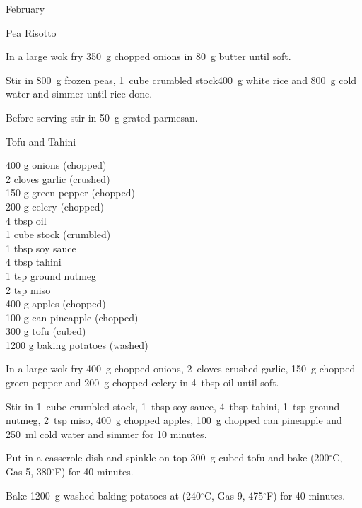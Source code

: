 \begin{menu}{February}
\begin{recipe}{2}{Pea Risotto}
	
    \begin{instructions}
    \item 
        In a large wok fry
        350~g chopped onions
        in
        80~g  butter
        until soft.
      \item 
        Stir in
        800~g  frozen peas,
        1~cube crumbled stock400~g  white rice
        and
        800~g  cold water
        and simmer until rice done.
      \item 
        Before serving stir in
        50~g grated parmesan.
      
    \end{instructions}
    \end{recipe}%
  
    \begin{recipe}{2}{Tofu and Tahini}%
		\begin{ingredients}
		400 g onions (chopped) \\
	2 cloves garlic (crushed) \\
	150 g green pepper (chopped) \\
	200 g celery (chopped) \\
	4 tbsp oil  \\
	1 cube stock (crumbled) \\
	1 tbsp soy sauce  \\
	4 tbsp tahini  \\
	1 tsp ground nutmeg  \\
	2 tsp miso  \\
	400 g apples (chopped) \\
	100 g can pineapple (chopped) \\
	300 g tofu (cubed) \\
	1200 g baking potatoes (washed) \\
	
		\end{ingredients}
	
	
    \begin{instructions}
    \item 
        In a large wok fry
        400~g chopped onions,
        2~cloves crushed garlic,
        150~g chopped green pepper
        and
        200~g chopped celery
        in
        4~tbsp  oil
        until soft.
      \item 
        Stir in
        1~cube crumbled stock,
        1~tbsp  soy sauce,
        4~tbsp  tahini,
        1~tsp  ground nutmeg,
        2~tsp  miso,
        400~g chopped apples,
        100~g chopped can pineapple
        and
        250~ml  cold water
        and simmer for 10 minutes.
      \item 
        Put in a casserole dish
        and spinkle on top
        300~g cubed tofu
        and bake (200$^{\circ}$C, Gas 5, 380$^{\circ}$F) for 40 minutes.
      \item 
    Bake
    1200~g washed baking potatoes
    at
    (240$^{\circ}$C, Gas 9, 475$^{\circ}$F) for 40 minutes.
  

\end{instructions}
\end{recipe}
\end{menu}
